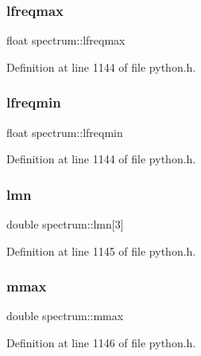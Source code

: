 \mbox{\label{structspectrum_ae5ca7c962612856ca7e5824f23df3ab3}} 
\subsubsection{\texorpdfstring{lfreqmax}{lfreqmax}}
{\footnotesize\ttfamily float spectrum\+::lfreqmax}



Definition at line 1144 of file python.\+h.

\mbox{\label{structspectrum_a91db2b868acbdb5b3a88a182a754fe70}} 
\subsubsection{\texorpdfstring{lfreqmin}{lfreqmin}}
{\footnotesize\ttfamily float spectrum\+::lfreqmin}



Definition at line 1144 of file python.\+h.

\mbox{\label{structspectrum_a7d970163bfe6485893b90bb22d85e25c}} 
\subsubsection{\texorpdfstring{lmn}{lmn}}
{\footnotesize\ttfamily double spectrum\+::lmn\mbox{[}3\mbox{]}}



Definition at line 1145 of file python.\+h.

\mbox{\label{structspectrum_a6f16d3fe14229087bf7a285bacce0b00}} 
\subsubsection{\texorpdfstring{mmax}{mmax}}
{\footnotesize\ttfamily double spectrum\+::mmax}



Definition at line 1146 of file python.\+h.

\mbox{\label{structspectrum_a2a1a99f9ec3161cc5ffc300b7350c5a6}} 
